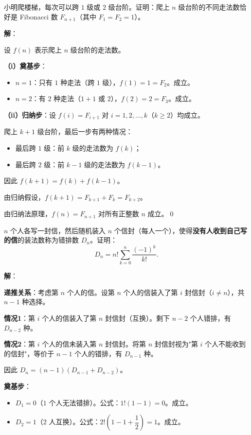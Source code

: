 \documentclass[12pt, a4paper]{ctexart}
\begin{document}
\begin{appbox}[【应用3】台阶走法问题]
小明爬楼梯，每次可以跨 $1$ 级或 $2$ 级台阶。证明：爬上 $n$ 级台阶的不同走法数恰好是 Fibonacci 数 $F_{n+1}$（其中 $F_1 = F_2 = 1$）。
\end{appbox}

\textbf{解}：

设 $f(n)$ 表示爬上 $n$ 级台阶的走法数。

\textbf{（i）奠基步}：
\begin{itemize}
  \item $n = 1$：只有 $1$ 种走法（跨 $1$ 级），$f(1) = 1 = F_2$。成立。
  \item $n = 2$：有 $2$ 种走法（$1+1$ 或 $2$），$f(2) = 2 = F_3$。成立。
\end{itemize}

\textbf{（ii）归纳步}：设 $f(i) = F_{i+1}$ 对 $i = 1, 2, \ldots, k$（$k \geq 2$）均成立。

爬上 $k+1$ 级台阶，最后一步有两种情况：
\begin{itemize}
  \item 最后跨 $1$ 级：前 $k$ 级的走法数为 $f(k)$；
  \item 最后跨 $2$ 级：前 $k-1$ 级的走法数为 $f(k-1)$。
\end{itemize}

因此 $f(k+1) = f(k) + f(k-1)$。

由归纳假设，$f(k+1) = F_{k+1} + F_k = F_{k+2}$。

由归纳法原理，$f(n) = F_{n+1}$ 对所有正整数 $n$ 成立。\qed

\begin{appbox}[【应用4】错排问题]
$n$ 个人各写一封信，然后随机装入 $n$ 个信封（每人一个），使得\textbf{没有人收到自己写的信}的装法数称为错排数 $D_n$。证明：
\[ D_n = n! \sum_{k=0}^{n}\frac{(-1)^k}{k!}. \]
\end{appbox}

\textbf{解}：

\textbf{递推关系}：考虑第 $n$ 个人的信。设第 $n$ 个人的信装入了第 $i$ 封信封（$i \neq n$），共 $n-1$ 种选择。

\textbf{情况1}：第 $i$ 个人的信装入了第 $n$ 封信封（互换）。剩下 $n-2$ 个人错排，有 $D_{n-2}$ 种。

\textbf{情况2}：第 $i$ 个人的信未装入第 $n$ 封信封。将第 $n$ 封信封视为"第 $i$ 个人不能收到的信封"，等价于 $n-1$ 个人的错排，有 $D_{n-1}$ 种。

因此 $D_n = (n-1)(D_{n-1} + D_{n-2})$。

\textbf{奠基步}：
\begin{itemize}
  \item $D_1 = 0$（$1$ 个人无法错排）。公式：$1!\left(1 - 1\right) = 0$。成立。
  \item $D_2 = 1$（$2$ 人互换）。公式：$2!\left(1 - 1 + \dfrac{1}{2}\right) = 1$。成立。
\end{itemize}
\end{document}
